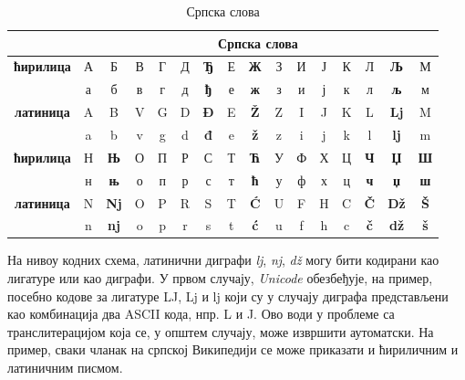 {\begin{multicols}{2}
\begin{table}[ht]
\begin{center}
\renewcommand{\arraystretch}{1.5}
\setlength{\arrayrulewidth}{1pt}
\begin{tabular}{|c|c|c|c|c|c|c|c|c|c|c|c|c|c|c|c|}
\cline{2-16}
\multicolumn{1}{c}{} & \multicolumn{15}{|c|}{{\textbf{Српска слова}}} \\
\hline
{\textbf{ћирилица}} & А & Б & В & Г & Д & \textbf{Ђ} & Е & \textbf{Ж} & З & И & Ј & К & Л & \textbf{Љ} & М \\ 
         & а & б & в & г & д & \textbf{ђ} & е & \textbf{ж} & з & и & ј & к & л & \textbf{љ} & м \\
\hline
{\textbf{латиница}} & A & B & V & G & D & \cellcolor{grey3}\textbf{Đ} & E & \cellcolor{grey3}\textbf{Ž} & Z & I & J & K & L & \cellcolor{grey2} \textbf{Lj} & M \\
         & a & b & v & g & d & \cellcolor{grey3} \textbf{đ} & e & \cellcolor{grey3}\textbf{ž} & z & i & j & k & l & \cellcolor{grey2} \textbf{lj} & m \\
\hline
{\textbf{ћирилица}} & Н & \textbf{Њ} & О & П & Р & С & Т & \textbf{Ћ} & У & Ф & Х & Ц & \textbf{Ч} & \textbf{Џ} & \textbf{Ш} \\
        & н & \textbf{њ} & о & п & р & с & т & \textbf{ћ} & у & ф & х & ц & \textbf{ч} & \textbf{џ} &  \textbf{ш} \\
\hline
{\textbf{латиница}} & N & \cellcolor{grey2} \textbf{Nj} & O & P & R & S & T & \cellcolor{grey3} \textbf{Ć} & U & F & H & C & \cellcolor{grey3} \textbf{Č} & \cellcolor{grey2} \textbf{Dž} & \cellcolor{grey3} \textbf{Š} \\
         & n & \cellcolor{grey2} \textbf{nj} & o & p & r & s & t & \cellcolor{grey3} \textbf{ć} & u & f & h & c & \cellcolor{grey3} \textbf{č} & \cellcolor{grey2} \textbf{dž} & \cellcolor{grey3} \textbf{š} \\
\hline
\end{tabular}
\end{center}
\caption{Српска слова}
 \label{azbuka}
\end{table}

На нивоу кодних схема, латинични диграфи \textit{lj}, \textit{nj}, \textit{dž} могу бити кодирани као лигатуре или као диграфи. У првом случају, \textit{Unicode} \cite{UNICODE} обезбеђује, на пример, посебно кодове за лигатуре LJ, Lj и lj који су у случају диграфа представљени као комбинација два ASCII кода,  нпр. L и J. Ово води у проблеме са транслитерацијом  која се, у општем случају, може извршити аутоматски. На пример, сваки чланак на српској Википедији се може приказати и ћириличним и латиничним писмом. 


\end{multicols}}

